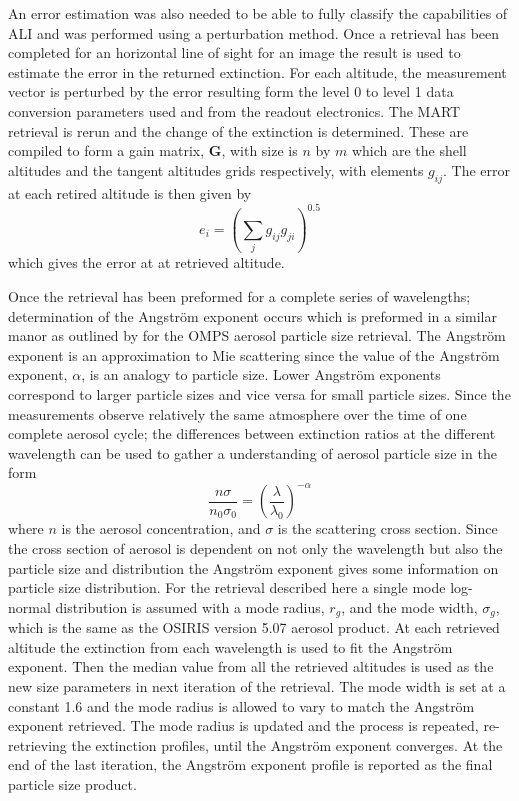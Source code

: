 \documentclass[12pt]{article}
\begin{document}
An error estimation was also needed to be able to fully classify the capabilities of ALI and was performed using a perturbation method. Once a retrieval has been completed for an horizontal line of sight for an image the result is used to estimate the error in the returned extinction. For each altitude, the measurement vector is perturbed by the error resulting form the level 0 to level 1 data conversion parameters used and from the readout electronics. The MART retrieval is rerun and the change of the extinction is determined. These are compiled to form a gain matrix, $\mathbf{G}$, with size is $n$ by $m$ which are the shell altitudes and the tangent altitudes grids respectively, with elements $g_{ij}$. The error at each retired altitude is then given by
\begin{equation}
    e_{i} = \left(\sum_{j}g_{ij}g_{ji}\right)^{0.5}
\end{equation}
which gives the error at at retrieved altitude.

Once the retrieval has been preformed for a complete series of wavelengths; determination of the Angstr\"{o}m exponent occurs which is preformed in a similar manor as outlined by \cite{Rault2013} for the OMPS aerosol particle size retrieval. The Angstr\"{o}m exponent is an approximation to Mie scattering since the value of the Angstr\"{o}m exponent, $\alpha$, is an analogy to particle size. Lower Angstr\"{o}m exponents correspond to larger particle sizes and vice versa for small particle sizes. Since the measurements observe relatively the same atmosphere over the time of one complete aerosol cycle; the differences between extinction ratios at the different wavelength can be used to gather a understanding of aerosol particle size in the form
\begin{equation}
    \frac{n\sigma}{n_{0}\sigma_{0}} = \left(\frac{\lambda}{\lambda_{0}}\right)^{-\alpha}
    \label{eqn:agstromCoefficient}
\end{equation}
where $n$ is the aerosol concentration, and $\sigma$ is the scattering cross section. Since the cross section of aerosol is dependent on not only the wavelength but also the particle size and distribution the Angstr\"{o}m exponent gives some information on particle size distribution. For the retrieval described here a single mode log-normal distribution is assumed with a mode radius, $r_{g}$, and the mode width, $\sigma_{g}$, which is the same as the OSIRIS version 5.07 aerosol product. At each retrieved altitude the extinction from each wavelength is used to fit the Angstr\"{o}m exponent. Then the median value from all the retrieved altitudes is used as the new size parameters in next iteration of the retrieval. The mode width is set at a constant 1.6 and the mode radius is allowed to vary to match the Angstr\"{o}m exponent retrieved. The mode radius is updated and the process is repeated, re-retrieving the extinction profiles, until the Angstr\"{o}m exponent converges. At the end of the last iteration, the Angstr\"{o}m exponent profile is reported as the final particle size product.
\end{document}
